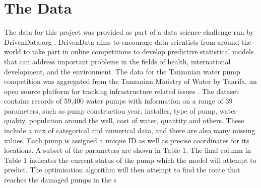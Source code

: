 \documentclass{article} %
\begin{document}
\section{The Data}

The data for this project was provided as part of a data science challenge run by DrivenData.org \cite{DrivenData2015}. DrivenData aims to encourage data scientists from around the world to take part in online competitions to develop predictive statistical models that can address important problems in the fields of health, international development, and the environment. The data for the Tanzanian water pump competition was aggregated from the Tanzanian Ministry of Water by Taarifa, an open source platform for tracking infrastructure related issues \cite{Taarifa2015}.  The dataset contains records of 59,400 water pumps with information on a range of 39 parameters, such as pump construction year, installer, type of pump, water quality, population around the well, cost of water, quantity and others. These include a mix of categorical and numerical data, and there are also many missing values. Each pump is assigned a unique ID as well as precise coordinates for its locations. A subset of the parameters are shown in Table 1. The final column in Table 1 indicates the current status of the pump which the model will attempt to predict. The optimisation algorithm will then attempt to find the route that reaches the damaged pumps in the s

\begin{table}[H]
\caption{Sample of the DrivenData Tanzania water wells dataset}
\centering
{}
\end{table}
\end{document}
